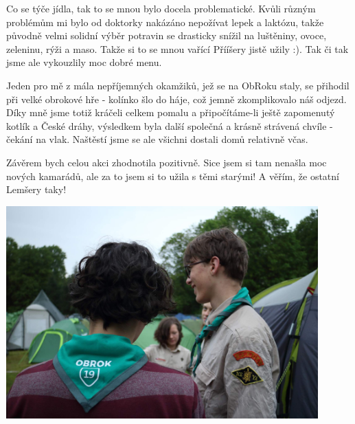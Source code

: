 Co se týče jídla, tak to se mnou bylo docela problematické. Kvůli různým problémům mi bylo od doktorky nakázáno nepožívat lepek a laktózu, takže původně velmi solidní výběr potravin se drasticky snížil na luštěniny, ovoce, zeleninu, rýži a maso. Takže si to se mnou vařící Přííšery jistě užily :). Tak či tak jsme ale vykouzlily moc dobré menu.


Jeden pro mě z mála nepříjemných okamžiků, jež se na ObRoku staly, se přihodil při velké obrokové hře - kolínko šlo do háje, což jemně zkomplikovalo náš odjezd. Díky mně jsme totiž kráčeli celkem pomalu a připočítáme-li ještě zapomenutý kotlík a České dráhy, výsledkem byla další společná a krásně strávená chvíle - čekání na vlak. Naštěstí jsme se ale všichni dostali domů relativně včas.


Závěrem bych celou akci zhodnotila pozitivně. Sice jsem si tam nenašla moc nových kamarádů, ale za to jsem si to užila s těmi starými! A věřím, že ostatní Lemšery taky!


\begin{center}

\includegraphics[width=12cm]{img/rovero_clanky/obrok2.JPG}

\end{center}


